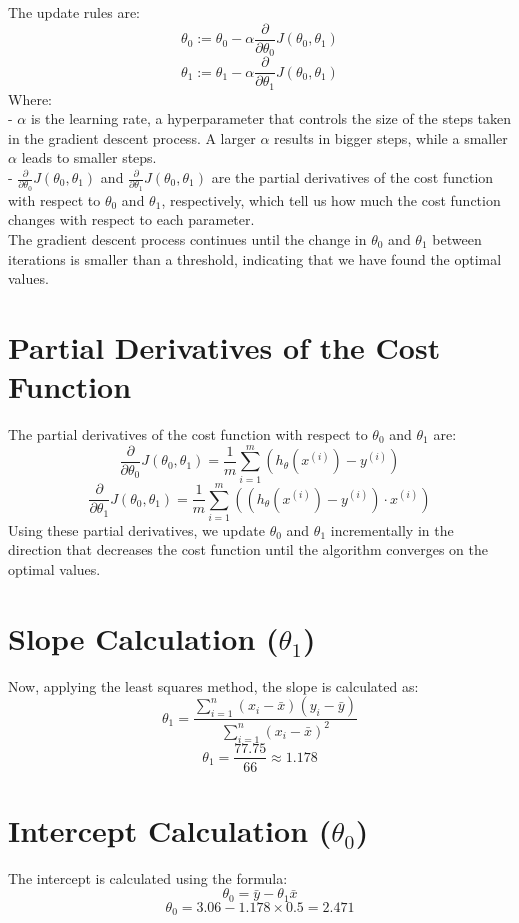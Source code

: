 \documentclass[12pt]{article}
\begin{document}
The update rules are:
\[
\theta_0 := \theta_0 - \alpha \frac{\partial}{\partial \theta_0} J(\theta_0, \theta_1)
\]
\[
\theta_1 := \theta_1 - \alpha \frac{\partial}{\partial \theta_1} J(\theta_0, \theta_1)
\]
Where: \\
- \( \alpha \) is the learning rate, a hyperparameter that controls the size of the steps taken in the gradient descent process. A larger \( \alpha \) results in bigger steps, while a smaller \( \alpha \) leads to smaller steps. \\
- \( \frac{\partial}{\partial \theta_0} J(\theta_0, \theta_1) \) and \( \frac{\partial}{\partial \theta_1} J(\theta_0, \theta_1) \) are the partial derivatives of the cost function with respect to \( \theta_0 \) and \( \theta_1 \), respectively, which tell us how much the cost function changes with respect to each parameter. \vspace{0.5cm}
\\

The gradient descent process continues until the change in \( \theta_0 \) and \( \theta_1 \) between iterations is smaller than a threshold, indicating that we have found the optimal values.


\section*{Partial Derivatives of the Cost Function}
The partial derivatives of the cost function with respect to \( \theta_0 \) and \( \theta_1 \) are:
\[
\frac{\partial}{\partial \theta_0} J(\theta_0, \theta_1) = \frac{1}{m} \sum_{i=1}^{m} \left( h_\theta(x^{(i)}) - y^{(i)} \right)
\]
\[
\frac{\partial}{\partial \theta_1} J(\theta_0, \theta_1) = \frac{1}{m} \sum_{i=1}^{m} \left( \left( h_\theta(x^{(i)}) - y^{(i)} \right) \cdot x^{(i)} \right)
\]
Using these partial derivatives, we update \( \theta_0 \) and \( \theta_1 \) incrementally in the direction that decreases the cost function until the algorithm converges on the optimal values.

\section*{Slope Calculation (\(\theta_1\))}
Now, applying the least squares method, the slope is calculated as:
\[
\theta_1 = \frac{\sum_{i=1}^{n} (x_i - \bar{x})(y_i - \bar{y})}{\sum_{i=1}^{n} (x_i - \bar{x})^2}
\]
\[
\theta_1 = \frac{77.75}{66} \approx 1.178
\]

\section*{Intercept Calculation (\(\theta_0\))}
The intercept is calculated using the formula:
\[
\theta_0 = \bar{y} - \theta_1 \bar{x}
\]
\[
\theta_0 = 3.06 - 1.178 \times 0.5 = 2.471
\]
\end{document}
